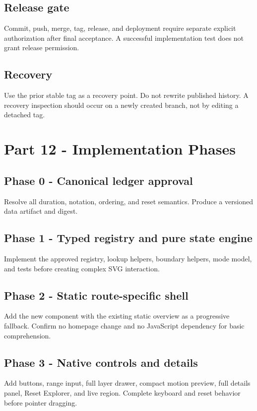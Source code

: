 \documentclass[11pt,letterpaper]{article}
\begin{document}
\subsection{Release gate}
Commit, push, merge, tag, release, and deployment require separate explicit authorization after final acceptance. A successful implementation test does not grant release permission.

\subsection{Recovery}
Use the prior stable tag as a recovery point. Do not rewrite published history. A recovery inspection should occur on a newly created branch, not by editing a detached tag.

\section{Part 12 - Implementation Phases}
\subsection{Phase 0 - Canonical ledger approval}
Resolve all duration, notation, ordering, and reset semantics. Produce a versioned data artifact and digest.

\subsection{Phase 1 - Typed registry and pure state engine}
Implement the approved registry, lookup helpers, boundary helpers, mode model, and tests before creating complex SVG interaction.

\subsection{Phase 2 - Static route-specific shell}
Add the new component with the existing static overview as a progressive fallback. Confirm no homepage change and no JavaScript dependency for basic comprehension.

\subsection{Phase 3 - Native controls and details}
Add buttons, range input, full layer drawer, compact motion preview, full details panel, Reset Explorer, and live region. Complete keyboard and reset behavior before pointer dragging.
\end{document}
